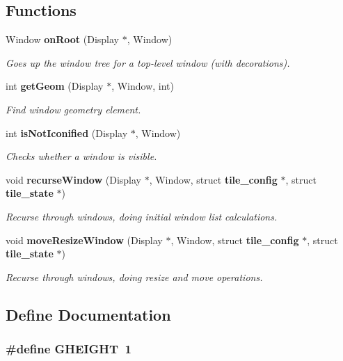 \subsection*{Functions}
\begin{CompactItemize}
\item 
Window {\bf on\-Root} (Display $\ast$, Window)
\begin{CompactList}\small\item\em Goes up the window tree for a top-level window (with decorations). \item\end{CompactList}\item 
int {\bf get\-Geom} (Display $\ast$, Window, int)
\begin{CompactList}\small\item\em Find window geometry element. \item\end{CompactList}\item 
int {\bf is\-Not\-Iconified} (Display $\ast$, Window)
\begin{CompactList}\small\item\em Checks whether a window is visible. \item\end{CompactList}\item 
void {\bf recurse\-Window} (Display $\ast$, Window, struct {\bf tile\_\-config} $\ast$, struct {\bf tile\_\-state} $\ast$)
\begin{CompactList}\small\item\em Recurse through windows, doing initial window list calculations. \item\end{CompactList}\item 
void {\bf move\-Resize\-Window} (Display $\ast$, Window, struct {\bf tile\_\-config} $\ast$, struct {\bf tile\_\-state} $\ast$)
\begin{CompactList}\small\item\em Recurse through windows, doing resize and move operations. \item\end{CompactList}\end{CompactItemize}


\subsection{Define Documentation}
\subsubsection{\setlength{\rightskip}{0pt plus 5cm}\#define GHEIGHT~1}\label{x11_8h_a1}


